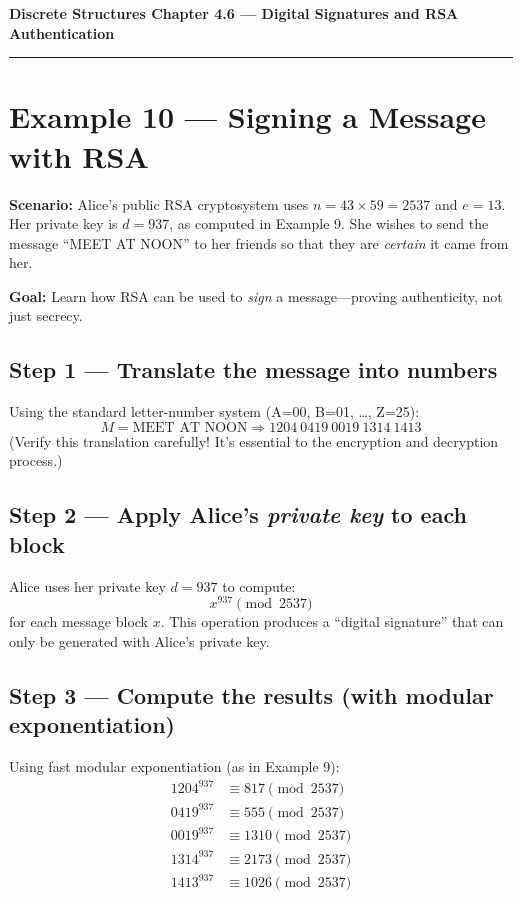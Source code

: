 \documentclass[12pt]{article}
\begin{document}
{\large \textbf{Discrete Structures \quad Chapter 4.6 — Digital Signatures and RSA Authentication}}

\hrule
\vspace{0.8em}

\section*{Example 10 — Signing a Message with RSA}

\textbf{Scenario:}  
Alice’s public RSA cryptosystem uses \( n = 43 \times 59 = 2537 \) and \( e = 13 \).  
Her private key is \( d = 937 \), as computed in Example 9.  
She wishes to send the message “MEET AT NOON” to her friends so that they are \emph{certain} it came from her.

\vspace{0.5em}
\textbf{Goal:} Learn how RSA can be used to \emph{sign} a message—proving authenticity, not just secrecy.

\subsection*{Step 1 — Translate the message into numbers}
Using the standard letter-number system (A=00, B=01, …, Z=25):  
\[
M = \text{MEET AT NOON} \Rightarrow 1204\ 0419\ 0019\ 1314\ 1413
\]
(Verify this translation carefully! It’s essential to the encryption and decryption process.)

\subsection*{Step 2 — Apply Alice’s \emph{private key} to each block}
Alice uses her private key \( d = 937 \) to compute:
\[
x^{937} \pmod{2537}
\]
for each message block \( x \).  
This operation produces a “digital signature” that can only be generated with Alice’s private key.

\subsection*{Step 3 — Compute the results (with modular exponentiation)}
Using fast modular exponentiation (as in Example 9):
\[
\begin{aligned}
1204^{937} &\equiv 817 \pmod{2537} \\
0419^{937} &\equiv 555 \pmod{2537} \\
0019^{937} &\equiv 1310 \pmod{2537} \\
1314^{937} &\equiv 2173 \pmod{2537} \\
1413^{937} &\equiv 1026 \pmod{2537}
\end{aligned}
\]
\end{document}
